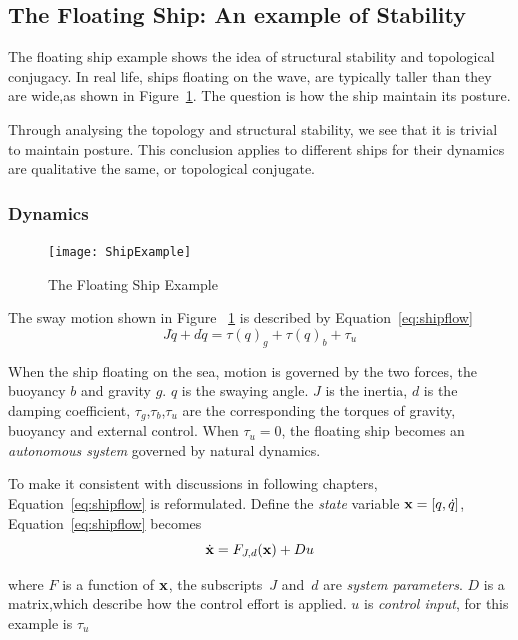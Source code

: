\subsection{The Floating Ship: An example of Stability}
The floating ship  example shows the idea of structural stability and topological conjugacy.
In real life, ships floating on the wave, are typically taller than they are wide,as shown in Figure~\ref{fig:ShipFloating}.
The  question is how the ship maintain its posture.

Through analysing the topology and structural stability, we see that it is trivial to maintain posture.
This conclusion applies to different ships for their dynamics are qualitative the same, or topological conjugate.


\subsubsection*{Dynamics}

\begin{figure}[!htbp]
  \begin{center}
    \texttt{[image: ShipExample]}
    \caption{The Floating Ship Example}
    \label{fig:ShipFloating}
  \end{center}
\end{figure}

The sway motion shown in Figure ~\ref{fig:ShipFloating} is described by Equation~\ref{eq:shipflow}
\begin{equation}
\label{eq:shipflow}
J\ddot{q}+d\dot{q}=\tau(q)_{g}+\tau(q)_{b}+\tau_{u}
\end{equation}

When the ship floating on the sea, motion is governed by the two forces, the buoyancy $b$ and gravity $g$.
$q$ is the swaying angle.
$J$ is the inertia,  
$d$ is the damping coefficient,
$\tau_{g}$,$\tau_{b}$,$\tau_{u}$ are the corresponding the torques of gravity, buoyancy and external control.
When $\tau_{u}=0$,  the floating ship  becomes an \emph{autonomous system} governed by natural dynamics.

To make it consistent with discussions in following chapters, Equation~\ref{eq:shipflow} is reformulated.
Define the \emph{state} variable $\mathbf{x}=[q,\dot{q}]$, Equation~\ref{eq:shipflow} becomes
\[
\dot{\mathbf{x}}=F_{J,d}(\mathbf{x})+Du
\]

where 
$F$ is a function of $\mathbf{x}$, the subscripts~$J$ and~$d$ are \emph{system parameters}.
$D$ is a matrix,which describe how the control effort is applied.
$u$ is \emph{control input}, for this example is $\tau_{u}$



